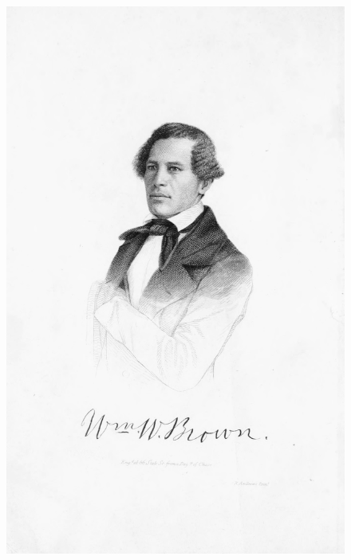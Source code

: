 \movetooddpage
\begin{absolutelynopagebreak}
\begin{vplace}
\begin{figure}[H]
\begin{adjustwidth}{-1.75cm}{}
  \vspace*{-2.6cm}
  \includegraphics[width=133mm]{./imgs/front1.jpg}  
\end{adjustwidth}
  \caption{}
\end{figure}
\end{vplace}

\thispagestyle{empty}
\end{absolutelynopagebreak}


